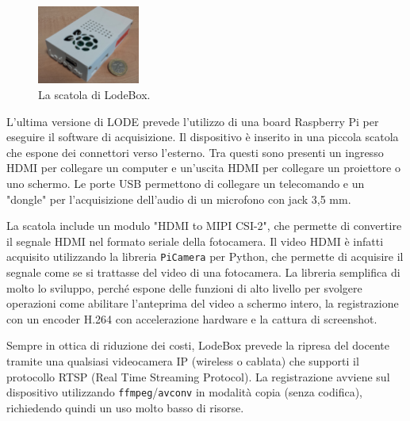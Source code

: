 \begin{figure}
	\vspace{-12pt}
	\includegraphics[width=0.3\textwidth]{res/lodebox}
	\caption{\label{fig:lodebox} La scatola di LodeBox.}
\end{figure}

L'ultima versione di LODE prevede l'utilizzo di una board Raspberry Pi per eseguire il software di acquisizione. Il dispositivo è inserito in una piccola scatola che espone dei connettori verso l'esterno. Tra questi sono presenti un ingresso HDMI per collegare un computer e un'uscita HDMI per collegare un proiettore o uno schermo. Le porte USB permettono di collegare un telecomando e un "dongle" per l'acquisizione dell'audio di un microfono con jack 3,5 mm.

La scatola include un modulo "HDMI to MIPI CSI-2", che permette di convertire il segnale HDMI nel formato seriale della fotocamera. Il video HDMI è infatti acquisito utilizzando la libreria \texttt{PiCamera} per Python, che permette di acquisire il segnale come se si trattasse del video di una fotocamera. La libreria semplifica di molto lo sviluppo, perché espone delle funzioni di alto livello per svolgere operazioni come abilitare l'anteprima del video a schermo intero, la registrazione con un encoder H.264\footnotemark{} con accelerazione hardware e la cattura di screenshot.


Sempre in ottica di riduzione dei costi, LodeBox prevede la ripresa del docente tramite una qualsiasi videocamera IP (wireless o cablata) che supporti il protocollo RTSP (Real Time Streaming Protocol). La registrazione avviene sul dispositivo utilizzando \texttt{ffmpeg}/\texttt{avconv}\footnotemark{} in modalità copia (senza codifica), richiedendo quindi un uso molto basso di risorse.


